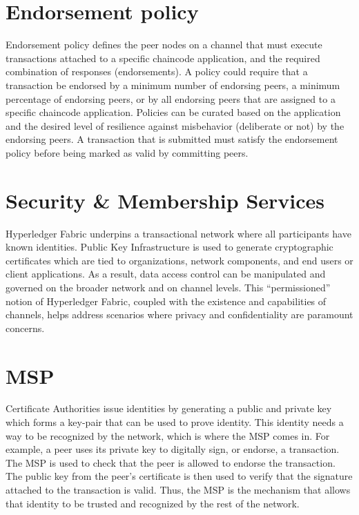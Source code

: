 \section{Endorsement policy}
Endorsement policy defines the peer nodes on a channel that must execute transactions attached to a specific chaincode application, and the required combination of responses (endorsements). A policy could require that a transaction be endorsed by a minimum number of endorsing peers, a minimum percentage of endorsing peers, or by all endorsing peers that are assigned to a specific chaincode application. Policies can be curated based on the application and the desired level of resilience against misbehavior (deliberate or not) by the endorsing peers. A transaction that is submitted must satisfy the endorsement policy before being marked as valid by committing peers.
\section{Security & Membership Services}
Hyperledger Fabric underpins a transactional network where all participants have known identities. Public Key Infrastructure is used to generate cryptographic certificates which are tied to organizations, network components, and end users or client applications. As a result, data access control can be manipulated and governed on the broader network and on channel levels. This “permissioned” notion of Hyperledger Fabric, coupled with the existence and capabilities of channels, helps address scenarios where privacy and confidentiality are paramount concerns.
\section{MSP}
Certificate Authorities issue identities by generating a public and private key which forms a key-pair that can be used to prove identity. This identity needs a way to be recognized by the network, which is where the MSP comes in. For example, a peer uses its private key to digitally sign, or endorse, a transaction. The MSP is used to check that the peer is allowed to endorse the transaction. The public key from the peer’s certificate is then used to verify that the signature attached to the transaction is valid. Thus, the MSP is the mechanism that allows that identity to be trusted and recognized by the rest of the network.



